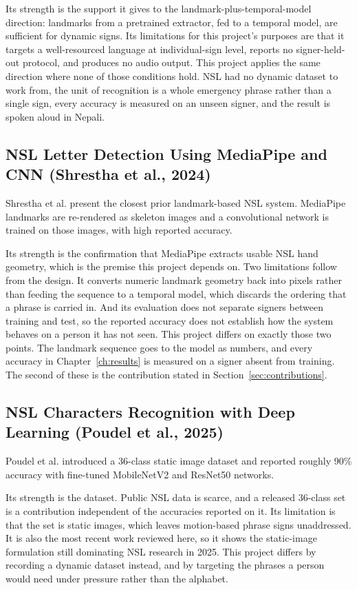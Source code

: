 Its strength is the support it gives to the landmark-plus-temporal-model direction: landmarks from a pretrained extractor, fed to a temporal model, are sufficient for dynamic signs. Its limitations for this project's purposes are that it targets a well-resourced language at individual-sign level, reports no signer-held-out protocol, and produces no audio output. This project applies the same direction where none of those conditions hold. NSL had no dynamic dataset to work from, the unit of recognition is a whole emergency phrase rather than a single sign, every accuracy is measured on an unseen signer, and the result is spoken aloud in Nepali.

\subsection{NSL Letter Detection Using MediaPipe and CNN (Shrestha et al., 2024)}
Shrestha et al. \cite{shrestha2024nsl} present the closest prior landmark-based NSL system. MediaPipe landmarks are re-rendered as skeleton images and a convolutional network is trained on those images, with high reported accuracy.

Its strength is the confirmation that MediaPipe extracts usable NSL hand geometry, which is the premise this project depends on. Two limitations follow from the design. It converts numeric landmark geometry back into pixels rather than feeding the sequence to a temporal model, which discards the ordering that a phrase is carried in. And its evaluation does not separate signers between training and test, so the reported accuracy does not establish how the system behaves on a person it has not seen. This project differs on exactly those two points. The landmark sequence goes to the model as numbers, and every accuracy in Chapter~\ref{ch:results} is measured on a signer absent from training. The second of these is the contribution stated in Section~\ref{sec:contributions}.

\subsection{NSL Characters Recognition with Deep Learning (Poudel et al., 2025)}
Poudel et al. \cite{poudel2025nsl} introduced a 36-class static image dataset and reported roughly 90\% accuracy with fine-tuned MobileNetV2 and ResNet50 networks.

Its strength is the dataset. Public NSL data is scarce, and a released 36-class set is a contribution independent of the accuracies reported on it. Its limitation is that the set is static images, which leaves motion-based phrase signs unaddressed. It is also the most recent work reviewed here, so it shows the static-image formulation still dominating NSL research in 2025. This project differs by recording a dynamic dataset instead, and by targeting the phrases a person would need under pressure rather than the alphabet.

